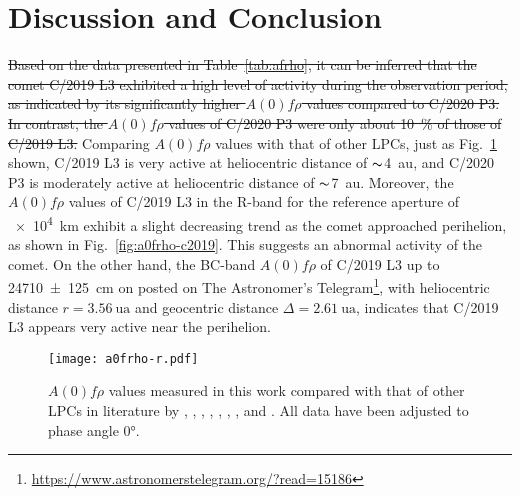 \section{Discussion and Conclusion}\label{sec:dis}


\st{Based on the data presented in Table~\ref{tab:afrho}, it can be inferred that the comet C/2019 L3 exhibited a high level of activity during the observation period, as indicated by its significantly higher $A(0)f\rho$ values compared to C/2020 P3. In contrast, the $A(0)f\rho$ values of C/2020 P3 were only about {\SI{10}{\percent}} of those of C/2019 L3.} 
Comparing $A(0)f\rho$ values with that of other LPCs, just as Fig.~\ref{fig:afrho-ref} shown, C/2019 L3 is very active at heliocentric distance of $\thicksim${\qty{4}{\astronomicalunit}}, and C/2020 P3 is moderately active at heliocentric distance of $\thicksim${\qty{7}{\astronomicalunit}}. 
Moreover, the $A(0)f\rho$ values of C/2019 L3 in the R-band for the reference aperture of {\SI{e4}{\km}} exhibit a slight decreasing trend as the comet approached perihelion, as shown in Fig.~\ref{fig:a0frho-c2019}. This suggests an abnormal activity of the comet. %
On the other hand, 
the BC-band $A(0)f\rho$ of C/2019 L3 up to \SI{24710 +- 125}{\cm} on  posted on The Astronomer's Telegram\footnote{\href{https://www.astronomerstelegram.org/?read=15186}{https://www.astronomerstelegram.org/?read=15186}}, with heliocentric distance $r = \SI{3.56}{\astronomicalunit}$ and geocentric distance $\Delta = \SI{2.61}{\astronomicalunit}$, indicates that C/2019 L3 appears very active near the perihelion. 


\begin{figure}
    \centering
    \texttt{[image: a0frho-r.pdf]}
    \caption{$A(0)f\rho$ values measured in this work compared with that of other LPCs in  literature by \citet{mazzotta_epifani_observational_2014}, \citet{garcia_photometry_2021}, \citet{garcia_observational_2020}, \citet{rousselot_monitoring_2014}, \citet{meech_activity_2009}, \citet{sarneczky_activity_2016}, \citet{solontoi_ensemble_2012}, and \citet{szabo_spectrophotometry_2002}. All data have been adjusted to phase angle \ang{0}. }\label{fig:afrho-ref}
\end{figure}%

